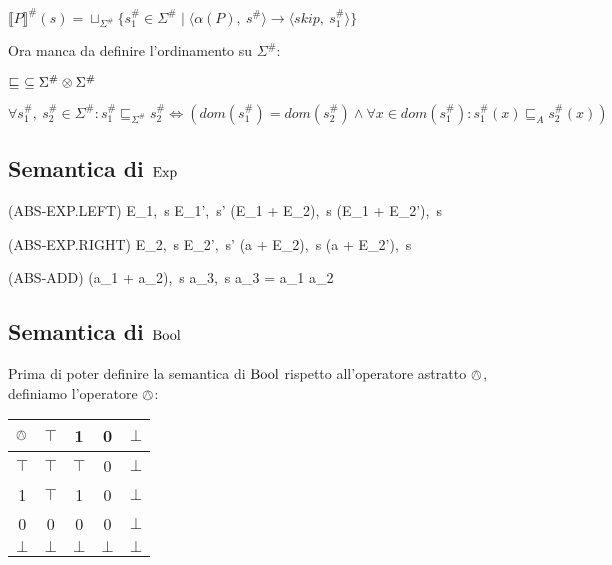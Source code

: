 \begin{center}
	$ \llbracket P \rrbracket^\# (s) =  \sqcup _{\Sigma^\#} \{ s^\#_1 \in \Sigma^\# \mid \langle \alpha(P),\ s^\# \rangle \rightarrow \langle skip,\ s^\#_1 \rangle \} $
\end{center}

Ora manca da definire l'ordinamento su $ \Sigma^\# $:
\begin{center}
	$ \sqsubseteq\ \subseteq \Sigma^\# \otimes \Sigma^\# $
\end{center}

\begin{center}
	$ \forall s_1^\#,\ s_2^\# \in \Sigma^\# : s_1^\# \sqsubseteq_{\Sigma^\#} s_2^\# \iff ( dom(s_1^\#) = dom(s_2^\#) \land \forall x \in dom(s_1^\#) : s_1^\#(x) \sqsubseteq_A s_2^\#(x) ) $
\end{center}

\subsection{Semantica di $\mathrm{Exp}$}

\begin{center}
	(ABS-EXP.LEFT)
	\prooftree
		\langle E_1,\ s \rangle \rightarrow \langle E_1',\ s' \rangle
		\justifies
		\langle (E_1 + E_2),\ s \rangle \rightarrow \langle (E_1 + E_2'),\ s \rangle		
	\endprooftree
\end{center}

\begin{center}
	(ABS-EXP.RIGHT)
	\prooftree
		\langle E_2,\ s \rangle \rightarrow \langle E_2',\ s' \rangle
		\justifies
		\langle (a + E_2),\ s \rangle \rightarrow \langle (a + E_2'),\ s\rangle
	\endprooftree
\end{center}

\begin{center}
	(ABS-ADD)
	\prooftree
		\justifies
		\langle (a_1 + a_2),\ s \rangle \rightarrow \langle a_3,\ s \rangle 
		\using a_3 = a_1 \absadd a_2
	\endprooftree
\end{center}

\subsection{Semantica di $\mathrm{Bool}$}

Prima di poter definire la semantica di $\mathrm{Bool}$ rispetto all'operatore astratto $\mathrel{\owedge}$, definiamo l'operatore $\mathrel{\owedge}$:

\begin{center}
	\begin{tabular}{| c | c | c | c | c |}
		\hline
		$\mathrel{\owedge}$ & $\top$ & 1 & 0 & $\bot$ \\
		\hline
		$\top$ & $\top$ & $\top$ & 0 & $\bot$ \\
		\hline
		1 & $\top$ & 1 & 0 & $\bot$ \\
		\hline
		0 & 0 & 0 & 0 & $\bot$ \\
		\hline
		$\bot$ & $\bot$ & $\bot$ & $\bot$ & $\bot$ \\
		\hline
	\end{tabular}
\end{center} 


